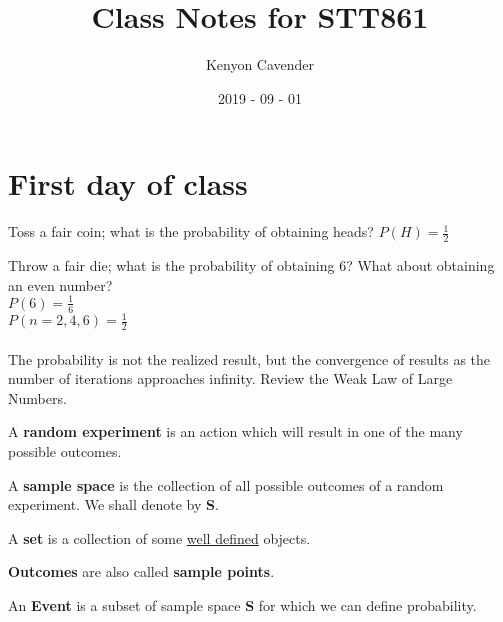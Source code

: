 \documentclass[12pt, oneside, letterpaper]{notes}
\begin{document}
\title{Class Notes for STT861}
\author{Kenyon Cavender}
\date{2019 - 09 - 01}
\maketitle

\section{First day of class}

\begin{myex}
Toss a fair coin; what is the probability of obtaining heads? $P(H) = \frac{1}{2}$
\end{myex}

\begin{myex}
Throw a fair die; what is the probability of obtaining 6?  What about obtaining an even number? \\
\indent$P(6) = \frac{1}{6}$ \\
\indent$P(n = 2,4,6) = \frac{1}{2}$ 
\end{myex}

\paragraph{}The probability is not the realized result, but the convergence of results as the number of iterations approaches infinity.  Review the Weak Law of Large Numbers.

\begin{mydef}
A \textbf{random experiment} is an action which will result in one of the many possible outcomes. 
\end{mydef}

\begin{mydef}
A \textbf{sample space} is the collection of all possible outcomes of a random experiment.  We shall denote by \textbf{S}.
\end{mydef}

\begin{mydef}
A \textbf{set} is a collection of some \underline{well defined} objects.
\end{mydef}

\begin{mydef}
\textbf{Outcomes} are also called \textbf{sample points}.
\end{mydef}

\begin{mydef}
An \textbf{Event} is a subset of sample space \textbf{S} for which we can define probability.
\end{mydef}
\end{document}
